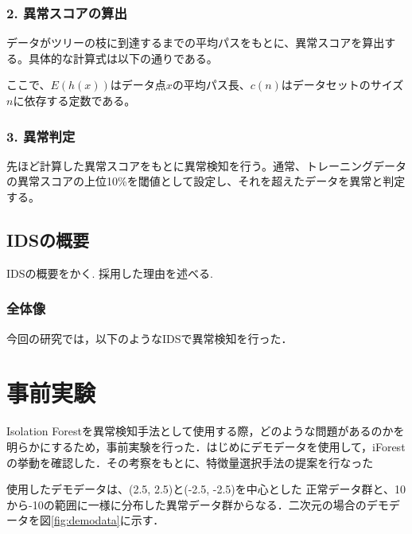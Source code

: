 \documentclass{css}
\begin{document}
\subsubsection*{2. 異常スコアの算出}
データがツリーの枝に到達するまでの平均パスをもとに、異常スコアを算出する。具体的な計算式は以下の通りである。

ここで、$E(h(x))$はデータ点$x$の平均パス長、$c(n)$はデータセットのサイズ$n$に依存する定数である。

\subsubsection*{3. 異常判定}
先ほど計算した異常スコアをもとに異常検知を行う。通常、トレーニングデータの異常スコアの上位10\%を閾値として設定し、それを超えたデータを異常と判定する。


\subsection{IDSの概要}

IDSの概要をかく.
採用した理由を述べる.

\subsubsection{全体像}
今回の研究では，以下のようなIDSで異常検知を行った．

\subsubsection{}


\section{事前実験}
Isolation Forestを異常検知手法として使用する際，どのような問題があるのかを明らかにするため，事前実験を行った．はじめにデモデータを使用して，iForestの挙動を確認した．その考察をもとに、特徴量選択手法の提案を行なった

使用したデモデータは、(2.5, 2.5)と(-2.5, -2.5)を中心とした
正常データ群と、10から-10の範囲に一様に分布した異常データ群からなる．二次元の場合のデモデータを図\ref{fig:demodata}に示す．
\end{document}
